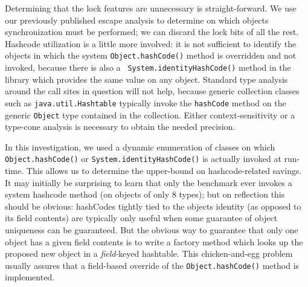 \documentclass[preprint]{acmconf}
\begin{document}
Determining that the lock features are unnecessary is straight-forward.
We use our previously published escape analysis
\cite{salcianu01,vivien01,whaley99}
to determine on which objects synchronization must be performed; we
can discard the lock bits of all the rest.  Hashcode utilization
is a little more involved: it is not sufficient to identify the
objects in which the system {\tt Object.hashCode()} method is
overridden and not invoked, because there is also a {\tt
  System.identityHashCode()} method in the library which provides the
same value on any object.  Standard type analysis around the
call sites in question will not help, because generic collection
classes such as {\tt java.util.Hashtable} typically invoke
the {\tt hashCode} method on the generic {\tt Object} type contained
in the collection.  Either context-sensitivity or a type-cone analysis
is necessary to obtain the needed precision.

In this investigation, we used a dynamic enumeration of classes on
which {\tt Object.hashCode()} or {\tt System.identityHashCode()} is
actually invoked at run-time.  This allows us to determine the
upper-bound on hashcode-related savings.  It may initially be
surprising to learn that only the  benchmark ever invokes a
system hashcode method (on objects of only 8 types); but on reflection
this should be obvious: hashCodes tightly tied to the objects identity
(as opposed to its field contents) are typically only useful when some
guarantee of object uniqueness can be guaranteed.  But the obvious way
to guarantee that only one object has a given field contents is to
write a factory method which looks up the proposed new object in a
{\it field}-keyed hashtable.  This chicken-and-egg problem usually
assures that a field-based override of the {\tt Object.hashCode()}
method is implemented.
\end{document}

